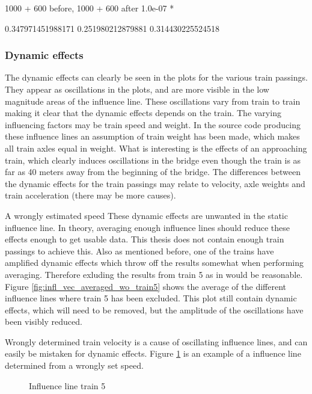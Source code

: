 1000 + 600 before, 1000 + 600 after
1.0e-07 *

0.347971451988171   0.251980212879881   0.314430225524518

\subsubsection{Dynamic effects}
The dynamic effects can clearly be seen in the plots for the various train passings. They appear as oscillations in the plots, and are more visible in the low magnitude areas of the influence line. These oscillations vary from train to train making it clear that the dynamic effects depends on the train. The varying influencing factors may be train speed and weight. In the source code producing these influence lines an assumption of train weight has been made, which makes all train axles equal in weight.
What is interesting is the effects of an approaching train, which clearly induces oscillations in the bridge even though the train is as far as 40 meters away from the beginning of the bridge. The differences between the dynamic effects for the train passings may relate to velocity, axle weights and train acceleration (there may be more causes).

A wrongly estimated speed
These dynamic effects are unwanted in the static influence line. In theory, averaging enough influence lines should reduce these effects enough to get usable data. This thesis does not contain enough train passings to achieve this. Also as mentioned before, one of the trains have amplified dynamic effects which throw off the results somewhat when performing averaging. Therefore exluding the results from train 5 as in would be reasonable. Figure \ref{fig:infl_vec_averaged_wo_train5} shows the average of the different influence lines where train 5 has been excluded. This plot still contain dynamic effects, which will need to be removed, but the amplitude of the oscillations have been visibly reduced.

Wrongly determined train velocity is a cause of oscillating influence lines, and can easily be mistaken for dynamic effects. Figure \ref{fig:train5_wrongSpeed} is an example of a influence line determined from a wrongly set speed.
\begin{figure}[H]
	\begin{adjustbox}{center}
		
	\end{adjustbox}
	\caption{Influence line train 5}
	\label{fig:train5_wrongSpeed}
\end{figure}

